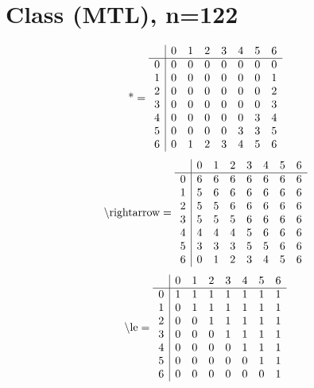 \documentclass[11pt]{article}
\begin{document}
\section{Class (MTL), n=122}
\[\text{*} = 
\begin{array}{r | r r r r r r r}
 & 0 & 1 & 2 & 3 & 4 & 5 & 6 \\ \hline
0 & 0 & 0 & 0 & 0 & 0 & 0 & 0 \\
1 & 0 & 0 & 0 & 0 & 0 & 0 & 1 \\
2 & 0 & 0 & 0 & 0 & 0 & 0 & 2 \\
3 & 0 & 0 & 0 & 0 & 0 & 0 & 3 \\
4 & 0 & 0 & 0 & 0 & 0 & 3 & 4 \\
5 & 0 & 0 & 0 & 0 & 3 & 3 & 5 \\
6 & 0 & 1 & 2 & 3 & 4 & 5 & 6 \\
\end{array}
\]
\[\text{\textbackslash rightarrow} = 
\begin{array}{r | r r r r r r r}
 & 0 & 1 & 2 & 3 & 4 & 5 & 6 \\ \hline
0 & 6 & 6 & 6 & 6 & 6 & 6 & 6 \\
1 & 5 & 6 & 6 & 6 & 6 & 6 & 6 \\
2 & 5 & 5 & 6 & 6 & 6 & 6 & 6 \\
3 & 5 & 5 & 5 & 6 & 6 & 6 & 6 \\
4 & 4 & 4 & 4 & 5 & 6 & 6 & 6 \\
5 & 3 & 3 & 3 & 5 & 5 & 6 & 6 \\
6 & 0 & 1 & 2 & 3 & 4 & 5 & 6 \\
\end{array}
\]
\[\text{\textbackslash le} = 
\begin{array}{r | r r r r r r r}
 & 0 & 1 & 2 & 3 & 4 & 5 & 6 \\ \hline
0 & 1 & 1 & 1 & 1 & 1 & 1 & 1 \\
1 & 0 & 1 & 1 & 1 & 1 & 1 & 1 \\
2 & 0 & 0 & 1 & 1 & 1 & 1 & 1 \\
3 & 0 & 0 & 0 & 1 & 1 & 1 & 1 \\
4 & 0 & 0 & 0 & 0 & 1 & 1 & 1 \\
5 & 0 & 0 & 0 & 0 & 0 & 1 & 1 \\
6 & 0 & 0 & 0 & 0 & 0 & 0 & 1 \\
\end{array}
\]
\end{document}
